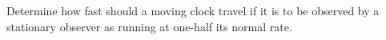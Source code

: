 Determine how fast should a moving clock travel if it is to be observed 
by a stationary observer as running at one-half its normal rate.